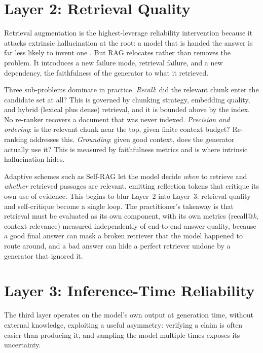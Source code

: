 \documentclass[11pt]{article}
\begin{document}
\section{Layer 2: Retrieval Quality}
\label{sec:retrieval}

Retrieval augmentation is the highest-leverage reliability intervention because
it attacks extrinsic hallucination at the root: a model that is handed the
answer is far less likely to invent one \citep{lewis2020rag,shuster2021retrieval,gao2023ragsurvey}.
But RAG relocates rather than removes the problem. It introduces a new failure
mode, retrieval failure, and a new dependency, the faithfulness of the generator
to what it retrieved.

Three sub-problems dominate in practice. \emph{Recall}: did the relevant chunk
enter the candidate set at all? This is governed by chunking strategy, embedding
quality, and hybrid (lexical plus dense) retrieval, and it is bounded above by
the index. No re-ranker recovers a document that was never indexed.
\emph{Precision and ordering}: is the relevant chunk near the top, given finite
context budget? Re-ranking addresses this. \emph{Grounding}: given good context,
does the generator actually use it? This is measured by faithfulness metrics
\citep{es2023ragas} and is where intrinsic hallucination hides.

Adaptive schemes such as Self-RAG \citep{asai2024selfrag} let the model decide
\emph{when} to retrieve and \emph{whether} retrieved passages are relevant,
emitting reflection tokens that critique its own use of evidence. This begins to
blur Layer~2 into Layer~3: retrieval quality and self-critique become a single
loop. The practitioner's takeaway is that retrieval must be evaluated as its own
component, with its own metrics (recall@\emph{k}, context relevance) measured
independently of end-to-end answer quality, because a good final answer can mask
a broken retriever that the model happened to route around, and a bad answer can
hide a perfect retriever undone by a generator that ignored it.

\section{Layer 3: Inference-Time Reliability}
\label{sec:inference}

The third layer operates on the model's own output at generation time, without
external knowledge, exploiting a useful asymmetry: verifying a claim is often
easier than producing it, and sampling the model multiple times exposes its
uncertainty.
\end{document}
